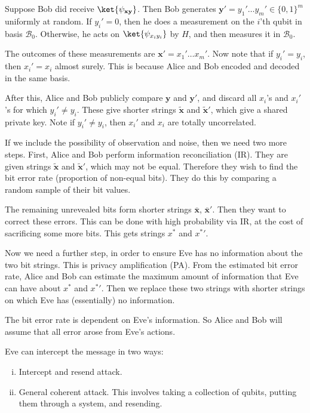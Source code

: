 \documentclass[12pt]{article}
\begin{document}
Suppose Bob did receive $\ket{\psi_{\mathbf{x}\mathbf{y}}}$. Then Bob generates $\mathbf{y}' = y_1' \ldots y_m' \in \{0, 1\}^m$ uniformly at random. If $y_i' = 0$, then he does a measurement on the $i$'th qubit in basis $\mathcal{B}_0$. Otherwise, he acts on $\ket{\psi_{x_i y_i}}$ by $H$, and then measures it in $\mathcal{B}_0$.

The outcomes of these measurements are $\mathbf{x}' = x_1' \ldots x_m'$. Now note that if $y_i' = y_i$, then $x_i' = x_i$ almost surely. This is because Alice and Bob encoded and decoded in the same basis.

After this, Alice and Bob publicly compare $\mathbf{y}$ and $\mathbf{y}'$, and discard all $x_i$'s and $x_i'$'s for which $y_i' \neq y_i$. These give shorter strings $\mathbf{\tilde x}$ and $\mathbf{\tilde x}'$, which give a shared private key. Note if $y_i' \neq y_i$, then $x_i'$ and $x_i$ are totally uncorrelated.

If we include the possibility of observation and noise, then we need two more steps. First, Alice and Bob perform information reconciliation (IR). They are given strings $\mathbf{\tilde x}$ and $\mathbf{\tilde x}'$, which may not be equal. Therefore they wish to find the bit error rate (proportion of non-equal bits). They do this by comparing a random sample of their bit values.

The remaining unrevealed bits form shorter strings $\mathbf{\bar x}$, $\mathbf{\bar x}'$. Then they want to correct these errors. This can be done with high probability via IR, at the cost of sacrificing some more bits. This gets strings $x^\ast$ and ${x^\ast}'$.

Now we need a further step, in order to ensure Eve has no information about the two bit strings. This is privacy amplification (PA). From the estimated bit error rate, Alice and Bob can estimate the maximum amount of information that Eve can have about $x^\ast$ and ${x^\ast}'$. Then we replace these two strings with shorter strings on which Eve has (essentially) no information.

The bit error rate is dependent on Eve's information. So Alice and Bob will assume that all error arose from Eve's actions.

Eve can intercept the message in two ways:
\begin{enumerate}[(i)]
	\item Intercept and resend attack.
	\item General coherent attack. This involves taking a collection of qubits, putting them through a system, and resending.
\end{enumerate}
\end{document}
